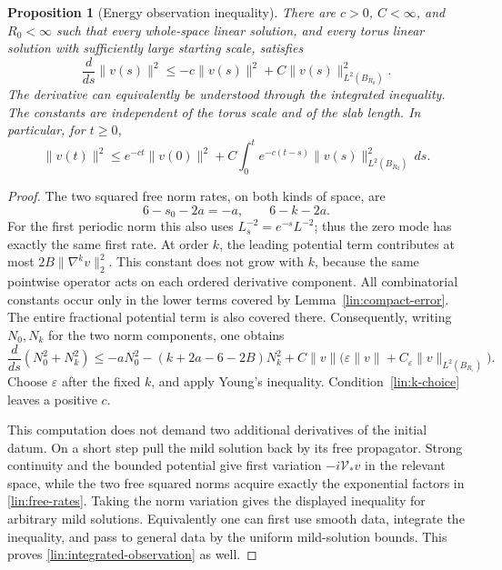 \documentclass[11pt]{article}
\numberwithin{equation}{section}
\newtheorem{proposition}[theorem]{Proposition}
\theoremstyle{definition}
\theoremstyle{remark}
\begin{document}
\begin{proposition}[Energy observation inequality]\label{lin:observation}
There are $c>0$, $C<\infty$, and $R_0<\infty$ such that every whole-space
linear solution, and every torus linear solution with sufficiently large
starting scale, satisfies
\begin{equation}\label{lin:energy-observation}
 \frac{d}{ds}\|v(s)\|^2
 \le-c\|v(s)\|^2+C\|v(s)\|_{L^2(B_{R_0})}^2.
\end{equation}
The derivative can equivalently be understood through the integrated
inequality.  The constants are independent of the torus scale and of
the slab length.  In particular, for $t\ge0$,
\begin{equation}\label{lin:integrated-observation}
 \|v(t)\|^2\le e^{-ct}\|v(0)\|^2
   +C\int_0^t e^{-c(t-s)}\|v(s)\|_{L^2(B_{R_0})}^2\,ds.
\end{equation}
\end{proposition}

\begin{proof}
The two squared free norm rates, on both kinds of space, are
\begin{equation}\label{lin:free-rates}
 6-s_0-2a=-a,\qquad 6-k-2a.
\end{equation}
For the first periodic norm this also uses
$L_s^{-2}=e^{-s}L^{-2}$; thus the zero mode has exactly the same first
rate.  At order $k$, the leading potential term contributes at most
$2B\|\nabla^kv\|_2^2$.  This constant does not grow with $k$, because
the same pointwise operator acts on each ordered derivative component.
All combinatorial constants occur only in the lower terms covered by
Lemma~\ref{lin:compact-error}.  The entire fractional potential term is
also covered there.  Consequently, writing $N_0,N_k$ for the two norm
components, one obtains
\[
 \frac{d}{ds}(N_0^2+N_k^2)
 \le-aN_0^2-(k+2a-6-2B)N_k^2
       +C\|v\|\big(\varepsilon\|v\|
                         +C_\varepsilon\|v\|_{L^2(B_{R_\varepsilon})}\big).
\]
Choose $\varepsilon$ after the fixed $k$, and apply Young's inequality.
Condition~\eqref{lin:k-choice} leaves a positive $c$.

This computation does not demand two additional derivatives of the
initial datum.  On a short step pull the mild solution back by its free
propagator.  Strong continuity and the bounded potential give first
variation $-i\mathcal V_*v$ in the relevant space, while the two free
squared norms acquire exactly the exponential factors in
\eqref{lin:free-rates}.  Taking the norm variation gives the displayed
inequality for arbitrary mild solutions.  Equivalently one can first
use smooth data, integrate the inequality, and pass to general data by
the uniform mild-solution bounds.  This proves
\eqref{lin:integrated-observation} as well.
\end{proof}
\end{document}
